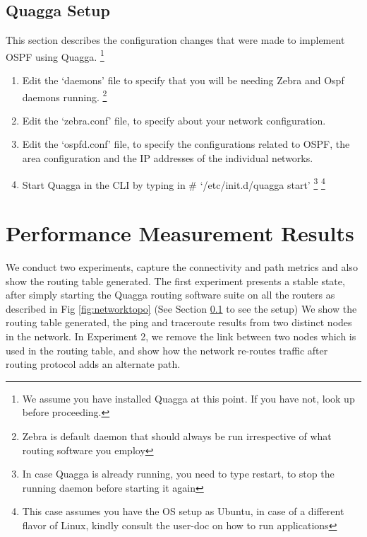\documentclass{article}
\begin{document}
\subsection{Quagga Setup}
\label{sec:quaggasetup}
This section describes the configuration changes that were made to implement OSPF using Quagga.
\footnote{We assume you have installed Quagga at this point. If you have not, look up \cite{quaggaubuntuinstall} \cite{quaggainstall} before proceeding.}
\begin{enumerate}
  \item Edit the `daemons' file to specify that you will be needing Zebra and Ospf daemons running. \footnote{Zebra is default daemon that should always be run
    irrespective of what routing software you employ}
  \item Edit the `zebra.conf' file, to specify about your network configuration.
  \item Edit the `ospfd.conf' file, to specify the configurations related to OSPF, the area configuration and the IP addresses of the individual networks.
  \item Start Quagga in the CLI by typing in \# `/etc/init.d/quagga start' 
    \footnote{In case Quagga is already running, you need to type restart, to stop the running daemon before starting it again}
    \footnote{This case assumes you have the OS setup as Ubuntu, in case of a different flavor of Linux, kindly consult the user-doc on how to run applications}
\end{enumerate}
\clearpage
\section{Performance Measurement Results}
We conduct two experiments, capture the connectivity and path metrics and also show the routing table generated.
The first experiment presents a stable state, after simply starting the Quagga routing software suite on all the routers as described in
Fig \ref{fig:networktopo} (See Section \ref{sec:quaggasetup} to see the setup)
We show the routing table generated, the ping and traceroute results from two distinct nodes in the network.
In Experiment 2, we remove the link between two nodes which is used in the routing table, and show how the network re-routes traffic 
after routing protocol adds an alternate path.
\end{document}
